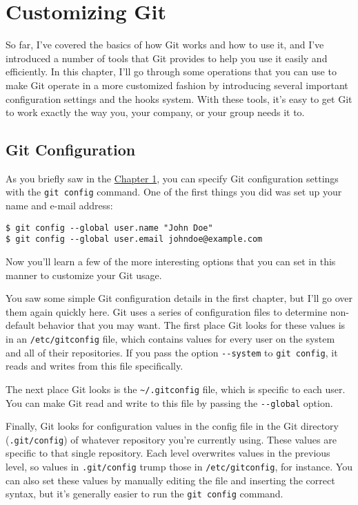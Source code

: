 \documentclass[a4paper]{book}
\newcommand{\prechap}{Chapter }
\newcommand{\postchap}{}
\newcommand{\chap}[1]{\newpage\thispagestyle{empty}\chapter{#1}\label{chap:\thechapter}}
\newcommand{\chapref}[1]{\hyperref[chap:#1]{\prechap #1\postchap}}
\begin{document}
\chap{Customizing Git}

So far, I've covered the basics of how Git works and how to use it, and I've introduced a number of tools that Git provides to help you use it easily and efficiently. In this chapter, I'll go through some operations that you can use to make Git operate in a more customized fashion by introducing several important configuration settings and the hooks system. With these tools, it's easy to get Git to work exactly the way you, your company, or your group needs it to.

\section{Git Configuration}

As you briefly saw in the \chapref{1}, you can specify Git configuration settings with the \texttt{git config} command. One of the first things you did was set up your name and e-mail address:

\begin{shaded}\begin{verbatim}
$ git config --global user.name "John Doe"
$ git config --global user.email johndoe@example.com
\end{verbatim}\end{shaded}

Now you'll learn a few of the more interesting options that you can set in this manner to customize your Git usage.

You saw some simple Git configuration details in the first chapter, but I'll go over them again quickly here. Git uses a series of configuration files to determine non-default behavior that you may want. The first place Git looks for these values is in an \texttt{/etc/gitconfig} file, which contains values for every user on the system and all of their repositories. If you pass the option \texttt{-{}-system} to \texttt{git config}, it reads and writes from this file specifically.

The next place Git looks is the \texttt{\textasciitilde{}/.gitconfig} file, which is specific to each user. You can make Git read and write to this file by passing the \texttt{-{}-global} option.

Finally, Git looks for configuration values in the config file in the Git directory (\texttt{.git/config}) of whatever repository you're currently using. These values are specific to that single repository. Each level overwrites values in the previous level, so values in \texttt{.git/config} trump those in \texttt{/etc/gitconfig}, for instance. You can also set these values by manually editing the file and inserting the correct syntax, but it's generally easier to run the \texttt{git config} command.
\end{document}
